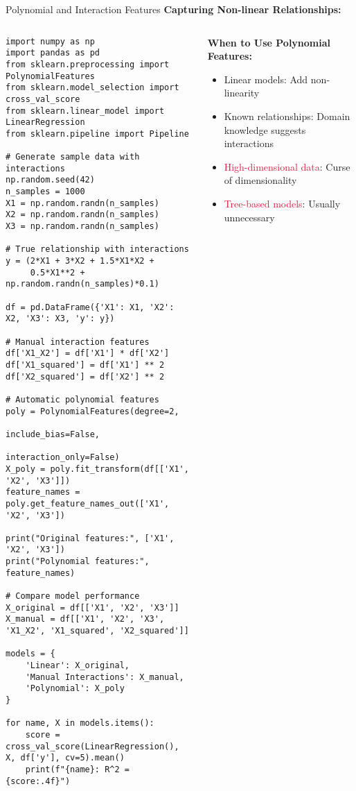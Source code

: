 \documentclass[aspectratio=169,11pt]{beamer}
\begin{document}
\begin{frame}[fragile]{Polynomial and Interaction Features}
\textbf{Capturing Non-linear Relationships:}

\begin{columns}
\begin{column}{0.5\textwidth}
\begin{lstlisting}
import numpy as np
import pandas as pd
from sklearn.preprocessing import PolynomialFeatures
from sklearn.model_selection import cross_val_score
from sklearn.linear_model import LinearRegression
from sklearn.pipeline import Pipeline

# Generate sample data with interactions
np.random.seed(42)
n_samples = 1000
X1 = np.random.randn(n_samples)
X2 = np.random.randn(n_samples)
X3 = np.random.randn(n_samples)

# True relationship with interactions
y = (2*X1 + 3*X2 + 1.5*X1*X2 + 
     0.5*X1**2 + np.random.randn(n_samples)*0.1)

df = pd.DataFrame({'X1': X1, 'X2': X2, 'X3': X3, 'y': y})

# Manual interaction features
df['X1_X2'] = df['X1'] * df['X2']
df['X1_squared'] = df['X1'] ** 2
df['X2_squared'] = df['X2'] ** 2

# Automatic polynomial features
poly = PolynomialFeatures(degree=2, 
                         include_bias=False,
                         interaction_only=False)
X_poly = poly.fit_transform(df[['X1', 'X2', 'X3']])
feature_names = poly.get_feature_names_out(['X1', 'X2', 'X3'])

print("Original features:", ['X1', 'X2', 'X3'])
print("Polynomial features:", feature_names)

# Compare model performance
X_original = df[['X1', 'X2', 'X3']]
X_manual = df[['X1', 'X2', 'X3', 'X1_X2', 'X1_squared', 'X2_squared']]

models = {
    'Linear': X_original,
    'Manual Interactions': X_manual,
    'Polynomial': X_poly
}

for name, X in models.items():
    score = cross_val_score(LinearRegression(), X, df['y'], cv=5).mean()
    print(f"{name}: R^2 = {score:.4f}")
\end{lstlisting}
\end{column}
\begin{column}{0.5\textwidth}
\textbf{When to Use Polynomial Features:}

\begin{itemize}
\item \textcolor{forest}{Linear models}: Add non-linearity
\item \textcolor{forest}{Known relationships}: Domain knowledge suggests interactions
\item \textcolor{crimson}{High-dimensional data}: Curse of dimensionality
\item \textcolor{crimson}{Tree-based models}: Usually unnecessary
\end{itemize}


\end{column}
\end{columns}
\end{frame}
\end{document}
